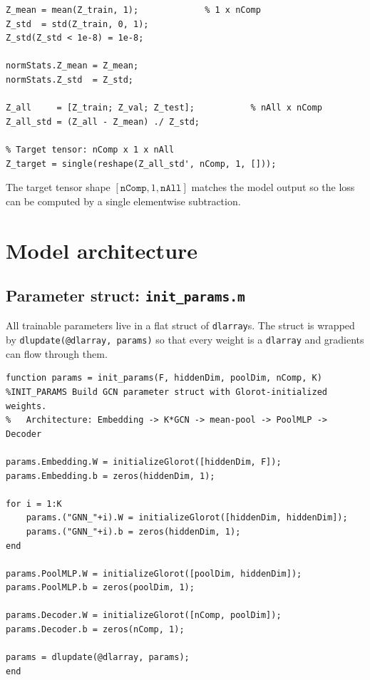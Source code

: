 \documentclass[11pt]{article}
\begin{document}
\begin{lstlisting}[caption={PCA target standardization},
                   label={lst:z-std}]
Z_mean = mean(Z_train, 1);             % 1 x nComp
Z_std  = std(Z_train, 0, 1);
Z_std(Z_std < 1e-8) = 1e-8;

normStats.Z_mean = Z_mean;
normStats.Z_std  = Z_std;

Z_all     = [Z_train; Z_val; Z_test];           % nAll x nComp
Z_all_std = (Z_all - Z_mean) ./ Z_std;

% Target tensor: nComp x 1 x nAll
Z_target = single(reshape(Z_all_std', nComp, 1, []));
\end{lstlisting}

The target tensor shape $[\texttt{nComp},1,\texttt{nAll}]$ matches the model
output so the loss can be computed by a single elementwise subtraction.

\section{Model architecture}

\subsection{Parameter struct: \texttt{init\_params.m}}

All trainable parameters live in a flat struct of \texttt{dlarray}s. The
struct is wrapped by \texttt{dlupdate(@dlarray, params)} so that every weight
is a \texttt{dlarray} and gradients can flow through them.

\begin{lstlisting}[caption={\texttt{helpers/init\_params.m}}]
function params = init_params(F, hiddenDim, poolDim, nComp, K)
%INIT_PARAMS Build GCN parameter struct with Glorot-initialized weights.
%   Architecture: Embedding -> K*GCN -> mean-pool -> PoolMLP -> Decoder

params.Embedding.W = initializeGlorot([hiddenDim, F]);
params.Embedding.b = zeros(hiddenDim, 1);

for i = 1:K
    params.("GNN_"+i).W = initializeGlorot([hiddenDim, hiddenDim]);
    params.("GNN_"+i).b = zeros(hiddenDim, 1);
end

params.PoolMLP.W = initializeGlorot([poolDim, hiddenDim]);
params.PoolMLP.b = zeros(poolDim, 1);

params.Decoder.W = initializeGlorot([nComp, poolDim]);
params.Decoder.b = zeros(nComp, 1);

params = dlupdate(@dlarray, params);
end
\end{lstlisting}
\end{document}
